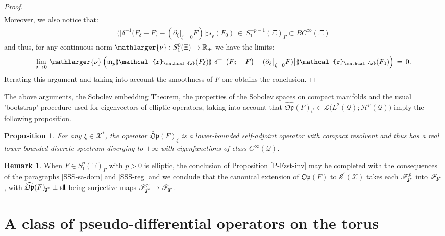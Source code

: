 \documentclass[12pt]{article}
\newtheorem{proposition}[theorem]{Proposition}
\theoremstyle{definition}
\newtheorem{remark}[theorem]{Remark}
\def\R{\mathbb{R}}
\def\Op{\mathfrak{Op}}
\def\X{\mathcal X}
\def\T{\mathcal{Q}}
\def\bb1{{\rm{1}\hspace{-3pt}\mathbf{l}}}
\def\bz{\mathfrak{z}\hspace*{-4pt}\mathfrak{z}}
\def\zz{\mathcal{z}}
\numberwithin{equation}{section}
\def\lnu{\mathlarger{\nu}}
\begin{document}
\begin{proof}
\begin{align*}
\end{align*}
Moreover, we also notice that:
\begin{align*}
	\Big(\big[\delta^{-1}\big(F_\delta-F\big)-(\partial_\xi\big|_{\xi=0}F)\big]\sharp\mathcal{r}_{\zz}(F_0)\,\in\,S^{-p-1}_1(\Xi)_\Gamma\subset{BC}^\infty(\Xi)
\end{align*}
and thus, for any continuous norm $\lnu:S^0_1(\Xi)\rightarrow\R_+$ we have the limits:
\begin{align*}
	\underset{\delta\rightarrow0}{\lim}\ \lnu\,\Big(\mathfrak{m}_p\sharp\mathcal{r}_{\zz}(F_\delta)\sharp\big[\delta^{-1}\big(F_\delta-F\big)-(\partial_\xi\big|_{\xi=0}F)\big]\sharp\mathcal{r}_{\zz}(F_0)\Big)\,=\,0.
\end{align*}
Iterating this argument and taking into account the smoothness of $F$ one obtains the conclusion.
\end{proof}

The above arguments, the Sobolev embedding Theorem, the properties of the Sobolev spaces on compact manifolds and the usual 'bootstrap' procedure used for eigenvectors of elliptic operators, taking into account that $\widehat{\Op}(F)_{\mathfrak{i}^*}\in\mathcal{L}\big(L^2(\T);\mathscr{H}^p(\T)\big)$ imply the following proposition.
\begin{proposition}\label{P-PNf-3}
For any $\xi\in\X^*$, the operator $\widetilde{\Op}(F)_{\xi}$  is a lower-bounded self-adjoint operator with compact resolvent and thus has a real lower-bounded discrete spectrum diverging to $+\infty$ with eigenfunctions of class $C^\infty(\T)$.
\end{proposition}

 \begin{remark}\label{R-PNf-1}
When $F\in{S}^p_1(\Xi)_{\Gamma}$ with $p>0$ is elliptic, the conclusion of Proposition \ref{P-Fzst-inv} may be completed with the consequences of the paragraphs \ref{SSS-sa-dom} and \ref{SSS-reg} and we conclude that the canonical extension of $\Op(F)$ to $\mathscr{S}^\prime(\X)$ takes each $\mathscr{F}^p_{\bz^*}$ into $\mathscr{F}_{\bz^*}$, with $\widehat{\Op}(F)_{\bz^*}\pm{i\bb1}$ being surjective maps $\mathscr{F}^p_{\bz^*}\rightarrow\mathscr{F}_{\bz^*}$.
\end{remark}


\section{A class of pseudo-differential operators on the torus}\label{S-3}
\end{document}
